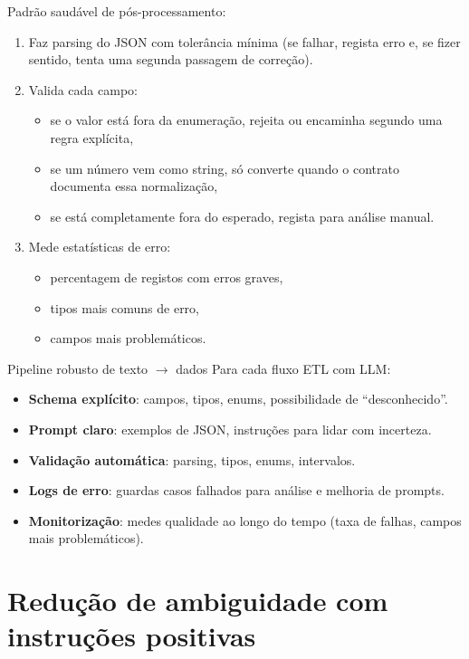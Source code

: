 Padrão saudável de pós-processamento:

\begin{enumerate}[leftmargin=*]
\item Faz parsing do JSON com tolerância mínima (se falhar, regista erro e, se fizer sentido, tenta uma segunda passagem de correção).
\item Valida cada campo:
\begin{itemize}[leftmargin=*]
\item se o valor está fora da enumeração, rejeita ou encaminha segundo uma regra explícita,
\item se um número vem como string, só converte quando o contrato documenta essa normalização,
\item se está completamente fora do esperado, regista para análise manual.
\end{itemize}
\item Mede estatísticas de erro:
\begin{itemize}[leftmargin=*]
\item percentagem de registos com erros graves,
\item tipos mais comuns de erro,
\item campos mais problemáticos.
\end{itemize}
\end{enumerate}

\begin{checklistbox}{Pipeline robusto de texto \texorpdfstring{$\to$}{->} dados}
Para cada fluxo ETL com LLM:

\begin{itemize}[leftmargin=*]
\item \textbf{Schema explícito}: campos, tipos, enums, possibilidade de “desconhecido”.
\item \textbf{Prompt claro}: exemplos de JSON, instruções para lidar com incerteza.
\item \textbf{Validação automática}: parsing, tipos, enums, intervalos.
\item \textbf{Logs de erro}: guardas casos falhados para análise e melhoria de prompts.
\item \textbf{Monitorização}: medes qualidade ao longo do tempo (taxa de falhas, campos mais problemáticos).
\end{itemize}
\end{checklistbox}

\section{Redução de ambiguidade com instruções positivas}

